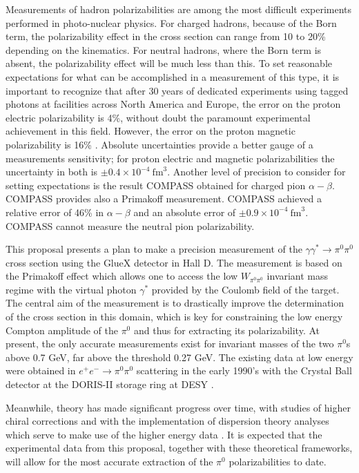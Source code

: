 Measurements of hadron polarizabilities are among the most difficult
experiments performed in photo-nuclear physics. For charged hadrons,
because of the Born term, the polarizability effect in the cross
section can range from 10 to 20\% depending on the kinematics.  For
neutral hadrons, where the Born term is absent, the polarizability
effect will be much less than this.  To set reasonable expectations
for what can be accomplished in a measurement of this type, it is
important to recognize that after 30 years of dedicated experiments
using tagged photons at facilities across North America and Europe,
the error on the proton electric polarizability is 4\%, without doubt
the paramount experimental achievement in this field. However, the
error on the proton magnetic polarizability is 16\%
\cite{PDGTanabashi:2018oca}.  Absolute uncertainties provide a better
gauge of a measurements sensitivity; for proton electric and magnetic
polarizabilities the uncertainty in both is $\pm 0.4 \times
10^{-4}~\mathrm{fm}^3$.  Another level of precision to consider for
setting expectations is the result COMPASS obtained for charged pion
$\alpha - \beta$. COMPASS provides also a Primakoff measurement. COMPASS
achieved a relative error of 46\% in $\alpha - \beta$ and an absolute
error of $\pm 0.9 \times 10^{-4}~\mathrm{fm}^3$.  COMPASS cannot
measure the neutral pion polarizability.



This proposal presents a plan to make a precision measurement of the
$\gamma \gamma^* \rightarrow \pi^0 \pi^0$ cross section using the
GlueX detector in Hall D.  The measurement is based on the Primakoff
effect which allows one to access the low $W_{\pi^0\pi^0}$ invariant
mass regime with the virtual photon $\gamma^*$ provided by the
Coulomb field of the target. The central aim of the measurement is to
drastically improve the determination of the cross section in this
domain, which is key for constraining the low energy Compton amplitude
of the $\pi^0$ and thus for extracting its polarizability.  At
present, the only accurate measurements exist for invariant masses of
the two $\pi^0$s above 0.7 GeV, far above the threshold 0.27 GeV. The
existing data at low energy were obtained in $e^+ e^- \to \pi^0\pi^0 $
scattering in the early 1990's with the Crystal Ball detector at the
DORIS-II storage ring at DESY \cite{Marsiske:1990hx}.

Meanwhile, theory has made significant progress over time, with
studies of higher chiral corrections 
\cite{Bellucci:1994eb,Gasser:2005ud,Aleksejevs:2014eea} and with the
implementation of dispersion theory analyses which serve to make use
of the higher energy data
\cite{Oller:2008kf,Dai:2014zta,Dai:2014lza,Moussallam:2013una}. It is
expected that the experimental data from this proposal, together with
these theoretical frameworks, will allow for the most accurate
extraction of the $\pi^0$ polarizabilities to date.
